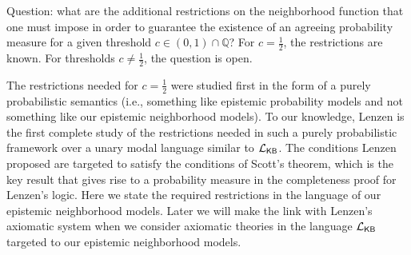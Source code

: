 \documentclass[12pt]{article}
\theoremstyle{definition}
\newcommand{\Rat}{\mathbb{Q}}  %
\newcommand{\Lang}{{\cal L}}   %
\newcommand{\KB}{{\mathsf{KB}}}                        %
\begin{document}
Question: what are the additional restrictions on the neighborhood
function that one must impose in order to guarantee the existence of
an agreeing probability measure for a given threshold
$c\in(0,1)\cap\Rat$?  For $c=\frac 12$, the restrictions are known.
For thresholds $c\neq\frac 12$, the question is open.

The restrictions needed for $c=\frac 12$ were studied first in the
form of a purely probabilistic semantics (i.e., something like
epistemic probability models and not something like our epistemic
neighborhood models).  To our knowledge, Lenzen \cite{Lenzen1980:gwuw}
is the first complete study of the restrictions needed in such a
purely probabilistic framework over a unary modal language similar to
$\Lang_\KB$. The conditions Lenzen proposed are targeted to satisfy
the conditions of Scott's theorem, which is the key result that gives
rise to a probability measure in the completeness proof for Lenzen's
logic.  Here we state the required restrictions in the language of our
epistemic neighborhood models.  Later we will make the link with
Lenzen's axiomatic system when we consider axiomatic theories in the
language $\Lang_\KB$ targeted to our epistemic neighborhood models.
\end{document}
